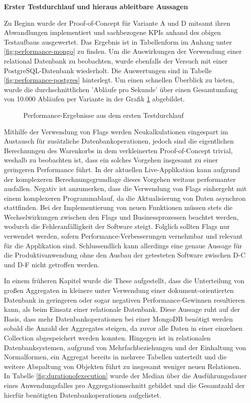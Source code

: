 \textbf{Erster Testdurchlauf und hieraus ableitbare Aussagen}

Zu Beginn wurde der Proof-of-Concept für Variante A und D mitsamt ihren Abwandlungen implementiert und sachbezogene KPIs anhand des obigen Testaufbaus ausgewertet. Das Ergebnis ist in Tabellenform im Anhang unter \ref{fig:performance-mongo} zu finden. Um die Auswirkungen der Verwendung einer relational Datenbank zu beobachten, wurde ebenfalls der Versuch mit einer PostgreSQL-Datenbank wiederholt. Die Auswertungen sind in Tabelle \ref{fig:performance-postgres} hinterlegt. Um einen schnellen Überblick zu bieten, wurde die durchschnittlichen 'Abläufe pro Sekunde' über einen Gesamtumfang von 10.000 Abläufen per Variante in der Grafik \ref{fig:PerformanceDefault} abgebildet.

\begin{figure}
	\centering
	\footnotesize
	
	\caption{Performance-Ergebnisse aus dem ersten Testdurchlauf}
	\label{fig:PerformanceDefault}
\end{figure}

Mithilfe der Verwendung von Flags werden Neukalkulationen eingespart im Austausch für zusätzliche Datenbankoperationen, jedoch sind die eigentlichen Berechnungen des Warenkorbs in dem verkleinerten Proof-of-Concept trivial, weshalb zu beobachten ist, dass ein solches Vorgehen insgesamt zu einer geringeren Performance führt. In der aktuellen Live-Applikation kann aufgrund der komplexeren Berechnungsgrundlage dieses Vorgehen weitaus performanter ausfallen. Negativ ist anzumerken, dass die Verwendung von Flags einhergeht mit einem komplexeren Programmablauf, da die Aktualisierung von Daten asynchron stattfinden. Bei der Implementierung von neuen Funktionen müssen stets die Wechselwirkungen zwischen den Flags und Businessprozessen beachtet werden, wodurch die Fehleranfälligkeit der Software steigt. Folglich sollten Flags nur verwendet werden, sofern Performance-Verbesserungen vernehmbar und relevant für die Applikation sind. Schlussendlich kann allerdings eine genaue Aussage für die Produktivanwendung ohne den Ausbau der getesteten Software zwischen D-C und D-F nicht getroffen werden.

In einem früheren Kapitel wurde die These aufgestellt, dass die Unterteilung von großen Aggregaten in kleinere unter Verwendung einer dokument-orientierten Datenbank in geringeren oder sogar negativen Performance-Gewinnen resultieren kann, als beim Einsatz einer relationale Datenbank. Diese Aussage ruht auf der Basis, dass mehr Datenbankoperationen bei einer MongoDB benötigt werden sobald die Anzahl der Aggregates steigen, da zuvor alle Daten in einer einzelnen Collection abgespeichert werden konnten. Hingegen ist in relationalen Datenbanksystemen, aufgrund von Mehrfachbeziehungen und der Einhaltung von Normalformen, ein Aggregat bereits in mehrere Tabellen unterteilt und die weitere Abspaltung von Objekten führt zu insgesamt weniger neuen Relationen. In Tabelle \ref{fig:durationofexecution} wurde der Median über die Ausführungsdauer eines Anwendungsfalles pro Aggregationsschnitt gebildet und die Gesamtzahl der hierfür benötigten Datenbankoperationen aufgelistet. 

